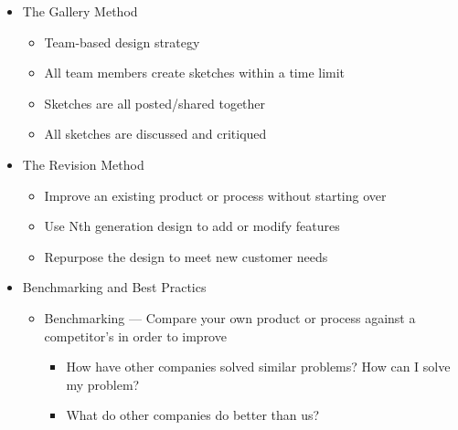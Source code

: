 \begin{itemize}
\begin{itemize}
    \end{itemize}

  \item The Gallery Method

    \begin{itemize}

      \item Team-based design strategy

      \item All team members create sketches within a time limit

      \item Sketches are all posted/shared together

      \item All sketches are discussed and critiqued

    \end{itemize}

  \item The Revision Method

    \begin{itemize}

      \item Improve an existing product or process without starting over

      \item Use Nth generation design to add or modify features

      \item Repurpose the design to meet new customer needs

    \end{itemize}

  \item Benchmarking and Best Practics

    \begin{itemize}

      \item Benchmarking — Compare your own product or process against a competitor's in order to improve

        \begin{itemize}

          \item How have other companies solved similar problems? How can I solve my problem?

          \item What do other companies do better than us?

        \end{itemize}


\end{itemize}
\end{itemize}
